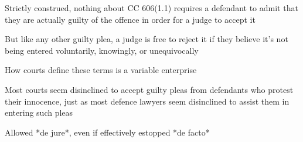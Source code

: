 Strictly construed, nothing about CC 606(1.1) requires a defendant to admit that they are actually guilty of the offence in order for a judge to accept it

But like any other guilty plea, a judge is free to reject it if they believe it's not being entered voluntarily, knowingly, or unequivocally

How courts define these terms is a variable enterprise

Most courts seem disinclined to accept guilty pleas from defendants who protest their innocence, just as most defence lawyers seem disinclined to assist them in entering such pleas

Allowed *de jure*, even if effectively estopped *de facto*